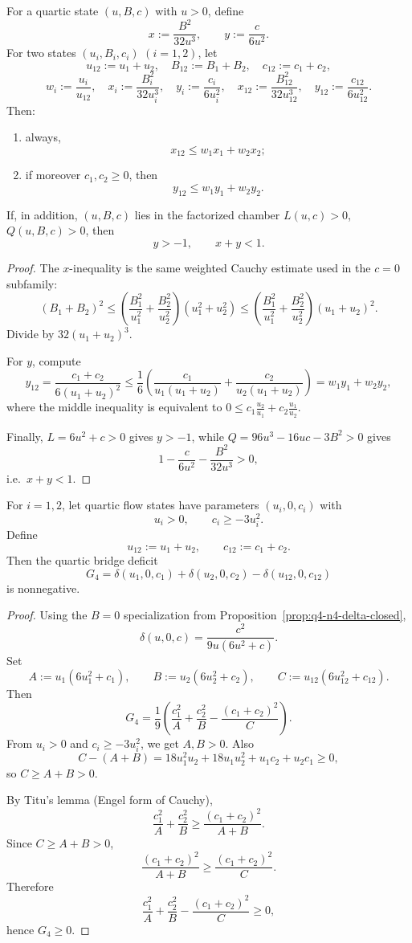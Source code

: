 \begin{proposition}\label{prop:q4-n4-normalized-params}
For a quartic state $(u,B,c)$ with $u>0$, define
\[
x:=\frac{B^2}{32u^3},\qquad y:=\frac{c}{6u^2}.
\]
For two states $(u_i,B_i,c_i)$ $(i=1,2)$, let
\[
u_{12}:=u_1+u_2,\quad B_{12}:=B_1+B_2,\quad c_{12}:=c_1+c_2,
\]
\[
w_i:=\frac{u_i}{u_{12}},\quad
x_i:=\frac{B_i^2}{32u_i^3},\quad
y_i:=\frac{c_i}{6u_i^2},\quad
x_{12}:=\frac{B_{12}^2}{32u_{12}^3},\quad
y_{12}:=\frac{c_{12}}{6u_{12}^2}.
\]
Then:
\begin{enumerate}[nosep]
\item always,
\[
x_{12}\le w_1x_1+w_2x_2;
\]
\item if moreover $c_1,c_2\ge 0$, then
\[
y_{12}\le w_1y_1+w_2y_2.
\]
\end{enumerate}
If, in addition, $(u,B,c)$ lies in the factorized chamber
$L(u,c)>0$, $Q(u,B,c)>0$, then
\[
y>-1,\qquad x+y<1.
\]
\end{proposition}

\begin{proof}
The $x$-inequality is the same weighted Cauchy estimate used in the $c=0$
subfamily:
\[
(B_1+B_2)^2
\le
\left(\frac{B_1^2}{u_1^2}+\frac{B_2^2}{u_2^2}\right)(u_1^2+u_2^2)
\le
\left(\frac{B_1^2}{u_1^2}+\frac{B_2^2}{u_2^2}\right)(u_1+u_2)^2.
\]
Divide by $32(u_1+u_2)^3$.

For $y$, compute
\[
y_{12}
=\frac{c_1+c_2}{6(u_1+u_2)^2}
\le
\frac1{6}\!\left(\frac{c_1}{u_1(u_1+u_2)}+\frac{c_2}{u_2(u_1+u_2)}\right)
=w_1y_1+w_2y_2,
\]
where the middle inequality is equivalent to
$0\le c_1\frac{u_2}{u_1}+c_2\frac{u_1}{u_2}$.

Finally, $L=6u^2+c>0$ gives $y>-1$, while
$Q=96u^3-16uc-3B^2>0$ gives
\[
1-\frac{c}{6u^2}-\frac{B^2}{32u^3}>0,
\]
i.e.\ $x+y<1$.
\end{proof}

\begin{proposition}[Closed $B=0$ quartic subfamily of the Route-1 bridge]\label{prop:q4-n4-b0-closed}
For $i=1,2$, let quartic flow states have parameters $(u_i,0,c_i)$ with
\[
u_i>0,\qquad c_i\ge -3u_i^2.
\]
Define
\[
u_{12}:=u_1+u_2,\qquad c_{12}:=c_1+c_2.
\]
Then the quartic bridge deficit
\[
G_4=\delta(u_1,0,c_1)+\delta(u_2,0,c_2)-\delta(u_{12},0,c_{12})
\]
is nonnegative.
\end{proposition}

\begin{proof}
Using the $B=0$ specialization from
Proposition~\ref{prop:q4-n4-delta-closed},
\[
\delta(u,0,c)=\frac{c^2}{9u(6u^2+c)}.
\]
Set
\[
A:=u_1(6u_1^2+c_1),\qquad B:=u_2(6u_2^2+c_2),\qquad
C:=u_{12}(6u_{12}^2+c_{12}).
\]
Then
\[
G_4=\frac19\left(\frac{c_1^2}{A}+\frac{c_2^2}{B}-\frac{(c_1+c_2)^2}{C}\right).
\]
From $u_i>0$ and $c_i\ge -3u_i^2$, we get $A,B>0$. Also
\[
C-(A+B)
=18u_1^2u_2+18u_1u_2^2+u_1c_2+u_2c_1
\ge 0,
\]
so $C\ge A+B>0$.

By Titu's lemma (Engel form of Cauchy),
\[
\frac{c_1^2}{A}+\frac{c_2^2}{B}\ge \frac{(c_1+c_2)^2}{A+B}.
\]
Since $C\ge A+B>0$,
\[
\frac{(c_1+c_2)^2}{A+B}\ge \frac{(c_1+c_2)^2}{C}.
\]
Therefore
\[
\frac{c_1^2}{A}+\frac{c_2^2}{B}-\frac{(c_1+c_2)^2}{C}\ge 0,
\]
hence $G_4\ge 0$.
\end{proof}

